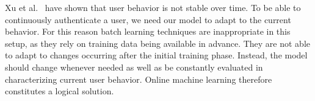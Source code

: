 \documentclass{llncs}
\begin{document}

Xu et al.~\cite{xu2014towards} have shown that user behavior is not stable over time. To be able to continuously authenticate a user, we need our model to adapt to the current behavior. For this reason batch learning techniques are inappropriate in this setup, as they rely on training data being available in advance. They are not able to adapt to changes occurring after the initial training phase. Instead, the model should change whenever needed as well as be constantly evaluated in characterizing current user behavior. Online machine learning therefore constitutes a logical solution.
\end{document}
